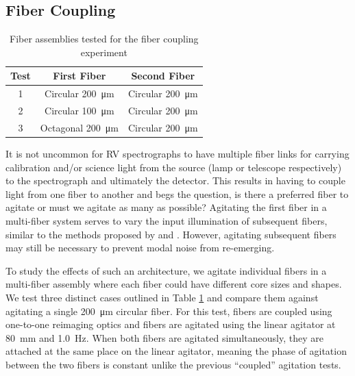 \subsection{Fiber Coupling}

\begin{table}
\centering
\caption{Fiber assemblies tested for the fiber coupling experiment}
	\begin{tabular}{ccc}
	\hline
	Test & First Fiber & Second Fiber \\
	\hline \hline
	1 & Circular \SI{200}{\micro\meter} & Circular \SI{200}{\micro\meter} \\
	\hline
	2 & Circular \SI{100}{\micro\meter} & Circular \SI{200}{\micro\meter} \\
	\hline
	3 & Octagonal \SI{200}{\micro\meter} & Circular \SI{200}{\micro\meter} \\
	\hline
	\end{tabular}
\label{table:fiber_coupling}
\end{table}

It is not uncommon for RV spectrographs to have multiple fiber links for carrying calibration and/or science light from the source (lamp or telescope respectively) to the spectrograph and ultimately the detector. This results in having to couple light from one fiber to another and begs the question, is there a preferred fiber to agitate or must we agitate as many as possible? Agitating the first fiber in a multi-fiber system serves to vary the input illumination of subsequent fibers, similar to the methods proposed by \citet{mahadevan_suppression_2014} and \citet{halverson_habitable-zone_2014}. However, agitating subsequent fibers may still be necessary to prevent modal noise from re-emerging.

To study the effects of such an architecture, we agitate individual fibers in a multi-fiber assembly where each fiber could have different core sizes and shapes. We test three distinct cases outlined in Table \ref{table:fiber_coupling} and compare them against agitating a single \SI{200}{\micro\meter} circular fiber. For this test, fibers are coupled using one-to-one reimaging optics and fibers are agitated using the linear agitator at \SI{80}{\milli\meter} and \SI{1.0}{\hertz}. When both fibers are agitated simultaneously, they are attached at the same place on the linear agitator, meaning the phase of agitation between the two fibers is constant unlike the previous ``coupled'' agitation tests.

